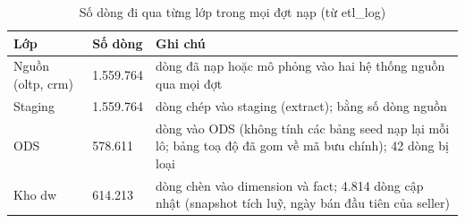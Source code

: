 \begin{table}[htbp]\centering\scriptsize\caption{Số dòng đi qua từng lớp trong mọi đợt nạp (từ etl\_log)}\label{tab:etl-layers}
\begin{tabular}{p{2.81cm}p{2.25cm}p{9.38cm}}\toprule
\textbf{Lớp} & \textbf{Số dòng} & \textbf{Ghi chú}\\\midrule
Nguồn (oltp, crm) & 1.559.764 & dòng đã nạp hoặc mô phỏng vào hai hệ thống nguồn qua mọi đợt\\
Staging & 1.559.764 & dòng chép vào staging (extract); bằng số dòng nguồn\\
ODS & 578.611 & dòng vào ODS (không tính các bảng seed nạp lại mỗi lô; bảng toạ độ đã gom về mã bưu chính); 42 dòng bị loại\\
Kho dw & 614.213 & dòng chèn vào dimension và fact; 4.814 dòng cập nhật (snapshot tích luỹ, ngày bán đầu tiên của seller)\\
\bottomrule\end{tabular}\end{table}
